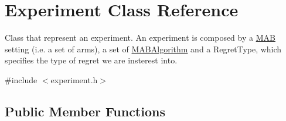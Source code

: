 \hypertarget{class_experiment}{}\section{Experiment Class Reference}
\label{class_experiment}


Class that represent an experiment. An experiment is composed by a \mbox{\hyperlink{class_m_a_b}{M\+AB}} setting (i.\+e. a set of arms), a set of \mbox{\hyperlink{class_m_a_b_algorithm}{M\+A\+B\+Algorithm}} and a Regret\+Type, which specifies the type of regret we are insterest into.  




{\ttfamily \#include $<$experiment.\+h$>$}

\subsection*{Public Member Functions}
